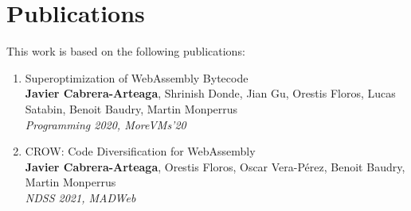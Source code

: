 \pagebreak
\section{Publications}

This work is based on the following publications:

\begin{enumerate}[label=\subscript{P}{{\arabic*}}]
    \item Superoptimization of WebAssembly Bytecode \cite{WasmSuperoptimizer}\\
    {\small\textbf{Javier Cabrera-Arteaga}, Shrinish Donde, Jian Gu, Orestis Floros, Lucas Satabin, Benoit Baudry, Martin Monperrus}\\
        \emph{Programming 2020, MoreVMs'20}\\
    \item CROW: Code Diversification for WebAssembly \cite{CROW}\\
    {\small\textbf{Javier Cabrera-Arteaga}, Orestis Floros, Oscar Vera-Pérez, Benoit Baudry, Martin Monperrus}\\
    \emph{NDSS 2021, MADWeb}\\

\end{enumerate}
